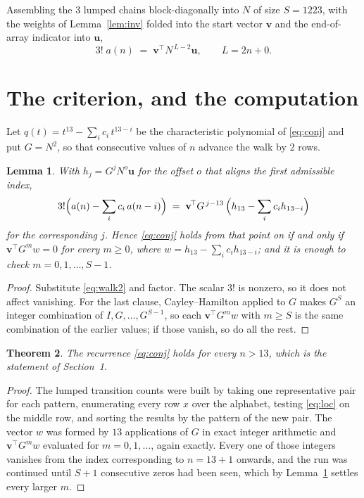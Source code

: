 \documentclass[11pt,a4paper]{article}
\theoremstyle{plain}
\newtheorem{theorem}{Theorem}
\newtheorem{lemma}[theorem]{Lemma}
\theoremstyle{definition}
\begin{document}
Assembling the $3$ lumped chains block-diagonally into $N$ of size $S=1223$, with the
weights of Lemma~\ref{lem:inv} folded into the start vector $\mathbf{v}$ and the
end-of-array indicator into $\mathbf{u}$,
\begin{equation}\label{eq:walk2}
3!\;a(n)\;=\;\mathbf{v}^{\!\top}N^{\,L-2}\mathbf{u},\qquad L=2n+0 .
\end{equation}

\section{The criterion, and the computation}

Let $q(t)=t^{13}-\sum_i c_i\,t^{13-i}$ be the characteristic polynomial of
\eqref{eq:conj} and put $G=N^{2}$, so that consecutive values of $n$ advance the
walk by $2$ rows.

\begin{lemma}\label{lem:crit}
With $h_j=G^{j}N^{o}\mathbf{u}$ for the offset $o$ that aligns the first admissible
index,
\[
3!\Bigl(a(n)-\sum_i c_i\,a(n-i)\Bigr)\;=\;\mathbf{v}^{\!\top}G^{\,j-13}\,
\Bigl(h_{13}-\sum_i c_i h_{13-i}\Bigr)
\]
for the corresponding $j$. Hence \eqref{eq:conj} holds from that point on if and only if
$\mathbf{v}^{\!\top}G^{m}w=0$ for every $m\ge0$, where
$w=h_{13}-\sum_i c_ih_{13-i}$; and it is enough to check $m=0,1,\dots,S-1$.
\end{lemma}

\begin{proof}
Substitute \eqref{eq:walk2} and factor. The scalar $3!$ is nonzero, so it does not
affect vanishing. For the last clause, Cayley--Hamilton applied to $G$ makes $G^{S}$ an
integer combination of $I,G,\dots,G^{S-1}$, so each $\mathbf{v}^{\!\top}G^{m}w$ with
$m\ge S$ is the same combination of the earlier values; if those vanish, so do all the rest.
\end{proof}

\begin{theorem}
The recurrence \eqref{eq:conj} holds for every $n>13$, which is the statement of
Section~1.
\end{theorem}

\begin{proof}
The lumped transition counts were built by taking one representative pair for each pattern,
enumerating every row $x$ over the alphabet, testing \eqref{eq:loc} on the middle
row, and sorting the results by the pattern of the new pair. The vector $w$ was formed by
$13$ applications of $G$ in exact integer arithmetic and $\mathbf{v}^{\!\top}G^{m}w$
evaluated for $m=0,1,\dots$, again exactly. Every one of those integers vanishes from the
index corresponding to $n=13+1$ onwards, and the run was continued until $S+1$
consecutive zeros had been seen, which by Lemma~\ref{lem:crit} settles every larger $m$.
\end{proof}
\end{document}
